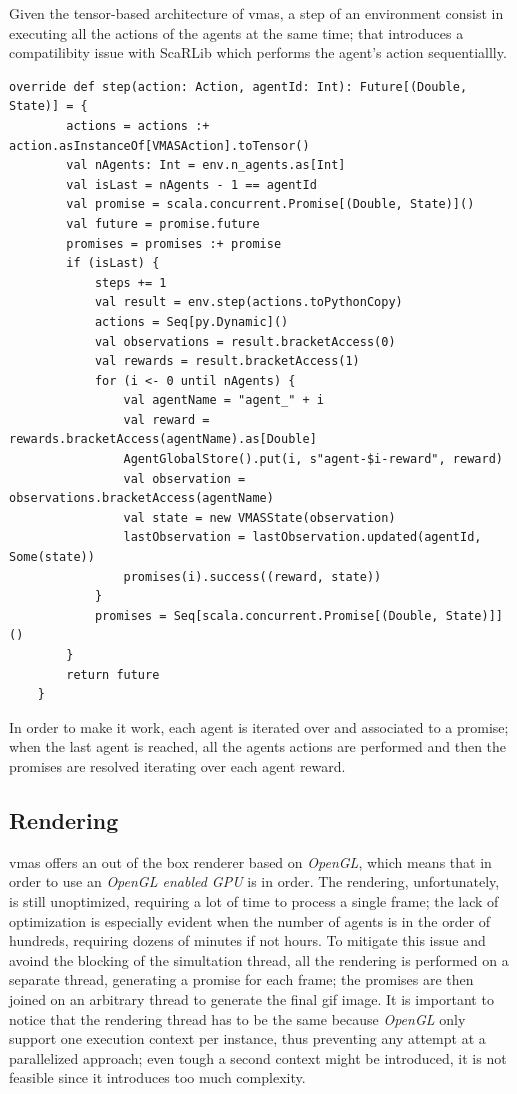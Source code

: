 \documentclass[12pt,a4paper,openright,twoside]{book}
\begin{document}
Given the tensor-based architecture of \ac{vmas}, a step of an environment consist in executing all the actions of the agents at the same time; that introduces 
a compatilibity issue with ScaRLib which performs the agent's action sequentiallly.
\begin{lstlisting}
override def step(action: Action, agentId: Int): Future[(Double, State)] = {
        actions = actions :+ action.asInstanceOf[VMASAction].toTensor()
        val nAgents: Int = env.n_agents.as[Int]
        val isLast = nAgents - 1 == agentId
        val promise = scala.concurrent.Promise[(Double, State)]()
        val future = promise.future
        promises = promises :+ promise
        if (isLast) {
            steps += 1
            val result = env.step(actions.toPythonCopy)
            actions = Seq[py.Dynamic]()
            val observations = result.bracketAccess(0)
            val rewards = result.bracketAccess(1)
            for (i <- 0 until nAgents) {
                val agentName = "agent_" + i
                val reward = rewards.bracketAccess(agentName).as[Double]
                AgentGlobalStore().put(i, s"agent-$i-reward", reward)
                val observation = observations.bracketAccess(agentName)
                val state = new VMASState(observation)
                lastObservation = lastObservation.updated(agentId, Some(state))
                promises(i).success((reward, state))
            }
            promises = Seq[scala.concurrent.Promise[(Double, State)]]()
        }
        return future
    }
\end{lstlisting}
In order to make it work, each agent is iterated over and associated to a promise; when the last agent is reached, all the agents actions are performed and then the promises are resolved iterating over each agent reward.

\subsection{Rendering}
\ac{vmas} offers an out of the box renderer based on \emph{OpenGL}, which means that in order to use an \emph{OpenGL enabled GPU} is in order.
The rendering, unfortunately, is still unoptimized, requiring a lot of time to process a single frame; the lack of optimization is especially evident when the number of agents is in the order of hundreds, requiring dozens of minutes if not hours.
To mitigate this issue and avoind the blocking of the simultation thread, all the rendering is performed on a separate thread, generating a promise for each frame; the promises are then joined on an arbitrary thread to generate the final gif image.
It is important to notice that the rendering thread has to be the same because \emph{OpenGL} only support one execution context per instance, thus preventing any attempt at a parallelized approach; even tough a second context might be introduced, it is not feasible since it introduces too much complexity.
\end{document}

